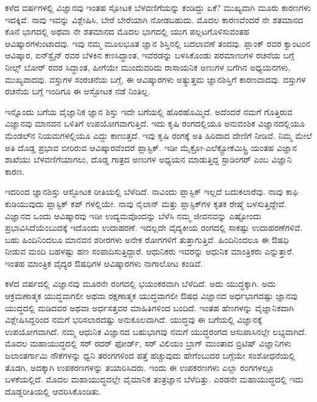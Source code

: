 
ಕಳೆದ  ವರ್ಷಗಳಲ್ಲಿ ವಿಜ್ಞಾನವು ಇಂತಹ ಸ್ಪೋಟಕ ಬೆಳವಣಿಗೆಯನ್ನು ಕಂಡಿದ್ದು ಏಕೆ? ಮುಖ್ಯವಾಗಿ ಮೂರು ಕಾರಣಗಳು ಇದಕ್ಕಿವೆ. ನಾವು ಇವನ್ನು ವಿಶ್ಲೇಷಿಸಿ, ಬೇರೆ ಬೇರೆಯಾಗಿ ನೋಡಬಹುದು. ಮೊದಲ ಕಾರಣವೆಂದರೆ ನೇ ಶತಮಾನದ ಕೊನೆ ಭಾಗದಲ್ಲಿ ಅಥವಾ ನೇ ಶತಮಾನದ ಮೊದಲ ಭಾಗದಲ್ಲಿ ಯುಗ ಪಲ್ಲಟಗೊಳಿಸುವಂತಹ ಆವಿಷ್ಕಾರಗಳುಂಟಾದವು. ಇವು ನಮ್ಮ ಮೂಲಭೂತ ಜ್ಞಾನ ಶಿಸ್ತಿನಲ್ಲಿ ಬದಲಾವಣೆ ತಂದವು. ಪ್ಲಾಂಕ್ ರವರ ಕ್ವಾಂಟಂನ ಆವಿಷ್ಕಾರ, ಐನ್‍ಸ್ಟೈನ್ ರವರ ಬೆಳಕಿನ ಕಣಸಿದ್ಧಾಂತ, ಇವೆರಡನ್ನು ಬಳಸಿಕೊಂಡು ಪರಮಾಣುಗಳ ರಚನೆಯ ಬಗ್ಗೆ ನೀಲ್ಸ್ ಬೋರ್ ರವರ ಸಿದ್ಧಾಂತ, ಹೀಗೆಯೇ ಮುಂದುವರಿದು ರಾಸಾಯನಿಕ ಅಣುಗಳ ಬಗೆಗಿನ ಅಧ್ಯಯನಗಳು, ಮುಖ್ಯವಾದವು. ವಸ್ತುಗಳ ಸಂರಚನೆಯ ಬಗ್ಗೆ, ಈ ಆವಿಷ್ಕಾರಗಳು ಅತ್ಯುತ್ತಮ ಜ್ಞಾನಶಿಸ್ತಿಗೆ ಕಾರಣವಾದವು. ವಸ್ತುಗಳ ರಚನೆಯ ಬಗ್ಗೆ ಇಂದಿಗೂ ಈ ಆಸ್ಫೋಟಕ ನಡೆ ನಿಂತಿಲ್ಲ.

ಇನ್ನೊಂದು ಬಗೆಯ ವೈಜ್ಞಾನಿಕ ಜ್ಞಾನ ಶಿಸ್ತು ಇದೇ ಬಗೆಯಲ್ಲಿ ಹೊರಹೊಮ್ಮಿದೆ. ಅದೆಂದರೆ ನಮಗೆ ಗೊತ್ತಿರುವ ವಿಜ್ಞಾನವು ಮಾನವನ ಒಳಿತಿಗೆ ಉಪಯೋಗವಾಗುತ್ತಿದೆ. ಇದು ಕೃಷಿ ರಂಗದಲ್ಲಿಯೂ ಅನುವಂಶಿಕ ವಿಜ್ಞಾನದಲ್ಲಿಯೂ ಮೆಂಡಲ್‍ನ ನಿಯಮಗಳಲ್ಲಿಯೂ ಎದ್ದು ಕಾಣುತ್ತದೆ. ಇವು ಕೃಷಿ ರಂಗಕ್ಕೆ ಅತಿ ಹಿರಿದಾದ ದೇಣಿಗೆ ನೀಡಿವೆ. ನಿಮ್ಮ ಮೇಲೆ ಅತಿ ದೊಡ್ಡ ಪ್ರಭಾವ ಬೀರಿರುವ ಆವಿಷ್ಕಾರವೆಂದರೆ ಪ್ಲಾಸ್ಟಿಕ್. ಇಡೀ ಮೈಕ್ರೋ-ಎಲೆಕ್ಟ್ರೋಕೆಮಿಸ್ಟ್ರಿ ಯಂತಹ ವಿಜ್ಞಾನ ಶಾಖೆಯು ಬೆಳವಣಿಗೆಯಾಗಲು, ದೊಡ್ಡ ಗಾತ್ರದ ಅಣುಗಳ ಅಧ್ಯಯನ ಮಾಡುತ್ತಿದ್ದ ಸ್ಟಾಡಿಂಗರ್ ಎಂಬ ವಿಜ್ಞಾನಿ ಕಾರಣ.

ಇದರಿಂದ ಜ್ಞಾನಶಿಸ್ತು ಆಸ್ಫೋಟಕ ರೀತಿಯಲ್ಲಿ ಬೆಳೆದಿದೆ. ನಾವಿಂದು ಪ್ಲಾಸ್ಟಿಕ್ ಇಲ್ಲದೆ ಬದುಕಲಾರೆವು. ನಾವು ಕಾಫಿ ಕುಡಿಯುವುದು ಪ್ಲಾಸ್ಟಿಕ್ ಕಪ್ ಗಳಲ್ಲಿಯೇ. ನಾವು ನೈಲಾನ್ ಮತ್ತು ಪ್ಲಾಸ್ಟಿಕ್‍ಗಳ ಕೃತಕ ರೇಷ್ಮೆ ಬಳಸುತ್ತಿದ್ದೇವೆ. ವಿಜ್ಞಾನದ ಒಂದು ಆವಿಷ್ಕಾರವು ಇಡೀ ಉದ್ಯಮವೊಂದನ್ನು ಬೆಳೆಸಿ ನಮ್ಮ ಜೀವನವನ್ನು ಎಷ್ಟೋಂದು ಪ್ರಭಾವಿಸಿದೆಯೆಂಬುದಕ್ಕೆ ಇದೊಂದು ಉದಾಹರಣೆ. ಇದಲ್ಲದೇ ವೈದ್ಯಕೀಯ ರಂಗದಲ್ಲಿ ಸಾಕಷ್ಟು ಉದಾಹರಣೆಗಳಿವೆ. ಬಹು ಹಿಂದಿನಿಂದಲೂ ಮಾನವನ ಶರೀರಗಳು ಅನೇಕ ರೋಗಗಳಿಗೆ ತುತ್ತಾಗುತ್ತಿವೆ. ಹಿಂದಿನಿಂದಲೂ ಈ ಔಷಧಿ ನೀಡುವ ಮಂದಿ ಬಹಳಷ್ಟು ಹಣ ಸಂಪಾದಿಸುತ್ತಿದ್ದಾರೆ. ಆಧುನಿಕರು ಇವರನ್ನು ಆಧುನಿಕ ಮಾಂತ್ರಿಕರು ಎನ್ನುತ್ತಾರೆ. ಇಂತಹ ಮಾಂತ್ರಿಕ ವೈದ್ಯರ ಔಷಧಿಗಳ ಆವಿಷ್ಕಾರಗಳು ನಾಗಾಲೋಟ ಕಂಡಿವೆ.

ಕಳೆದ  ವರ್ಷದಲ್ಲಿ ವಿಜ್ಞಾನವು ಮೂರನೇ ರಂಗದಲ್ಲಿ ಭಯಂಕರವಾಗಿ ಬೆಳೆದಿದೆ. ಅದು ಯುದ್ಧಕ್ಕಾಗಿ. ಅದು ಆಕ್ರಮಣಾತ್ಮಕ ಯುದ್ಧವಾಗಲೀ ಅಥವಾ ರಕ್ಷಣಾತ್ಮಕ ಯುದ್ಧವಾಗಲೀ ಔಷಧ ವಿಜ್ಞಾನದ ಅರ್ಧಭಾಗದಷ್ಟು ಜ್ಞಾನವು ಯುದ್ಧದಲ್ಲಿ ಮಡಿದವರ ಅಥವಾ ಅರ್ಧಸತ್ತವರ ಮಾಹಿತಿಗಳಿಂದ ಬಂದಿದೆ. ಇಂತಹ ಹೆಣಗಳನ್ನು ವೈಜ್ಞಾನಿಕವಾಗಿ ವಿಶ್ಲೇಷಿಸಿದ್ದರಿಂದ ನಮಗೆ ಭರಿಸಲಾರದಷ್ಟು ಅನುಕೂಲವಾಗಿದೆ. ಯುದ್ಧವು ಈ ಬಗೆಯಲ್ಲಿ ವಿಜ್ಞಾನಕ್ಕೆ ಉಪಯೋಗವಾಗಿದೆ. ನಮ್ಮ ಆಧುನಿಕ ವಿಜ್ಞಾನದ ಬಹುಭಾಗವು ನಮಗೆ ಯುದ್ಧರಂಗದ ಆಸುಪಾಸಿನಲ್ಲೇ ಲಭ್ಯವಾಗಿದೆ. ಮೊದಲ ಮಹಾಯುದ್ಧದಲ್ಲಿ ಸರ್ ರದರ್ ಫೋರ್ಡ್, ಸರ್ ವಿಲಿಯಂ ಬ್ರಾಗ್ ಮುಂತಾದ ಬ್ರಿಟಿಷ್ ವಿಜ್ಞಾನಿಗಳು ಜಲಾಂತರ್ಗಾಮಿ ನೌಕೆಗಳನ್ನು ಧ್ವನಿ ತರಂಗಗಳಿಂದ ಪತ್ತೆ ಹಚ್ಚುವುದು ಹೇಗೆಂಬುದರ ಬಗ್ಗೆಯೇ ಸಂಶೋಧನೆಯಲ್ಲಿ ತೊಡಗಿ, ಅದಕ್ಕಾಗಿ ಉಪಕರಣಗಳನ್ನು ತಯಾರಿಸಿದರು. ಇಂದು ಈ ಉಪಕರಣಗಳು ಎಲ್ಲಾ ರಂಗಗಳಲ್ಲೂ ಬಳಕೆಯಲ್ಲಿದೆ. ಮೊದಲ ಮಹಾಯುದ್ಧದಲ್ಲೇ ವೈಮಾನಿಕ ತಂತ್ರಜ್ಞಾನ ಬೆಳೆದಿತ್ತು. ಎರಡನೇ ಮಹಾಯುದ್ಧದಲ್ಲಿ ಇದು ದೊಡ್ಡರೀತಿಯಲ್ಲಿ ಆವರಿಸಿಕೊಂಡಿತು.

